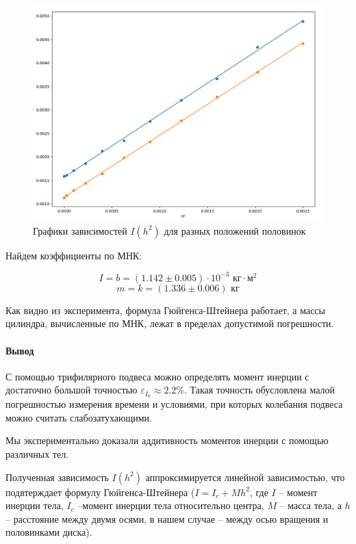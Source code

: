 \documentclass[a4paper, 10pt]{article}%
\begin{document}
\begin{enumerate}
		\begin{figure}[h]
			\centering
			\caption{Графики зависимостей $I(h^2)$ для разных положений половинок}
			\includegraphics{graph}
		\end{figure}
		
		Найдем коэффициенты по МНК:
		
		\[I = b = (1.142 \pm 0.005) \cdot 10^{-3} \text{ кг}\cdot\text{м}^2\]
		\[m = k = (1.336 \pm 0.006) \text{ кг}\]
		
		Как видно из эксперимента, формула Гюйгенса-Штейнера работает, а массы цилиндра, вычисленные по МНК, лежат в пределах допустимой погрешности.
		
		\paragraph{Вывод}
		С помощью трифилярного подвеса можно определять момент инерции с достаточно большой точностью $\varepsilon_{I_0} \approx 2.2\%$. Такая точность обусловлена малой погрешностью измерения времени и условиями, при которых колебания подвеса можно считать слабозатухающими.
		
		Мы экспериментально доказали аддитивность моментов инерции с помощью различных тел.
		
		Полученная зависимость $I(h^2)$ аппроксимируется линейной зависимостью, что подвтерждает формулу Гюйгенса-Штейнера ($I = I_c + Mh^2$, где $I$ -- момент инерции тела, $I_c$ --момент инерции тела относительно центра, $M$ -- масса тела, а $h$ -- расстояние между двумя осями, в нашем случае -- между осью вращения и половинками диска).
		
		
	\end{enumerate}
\end{document}

